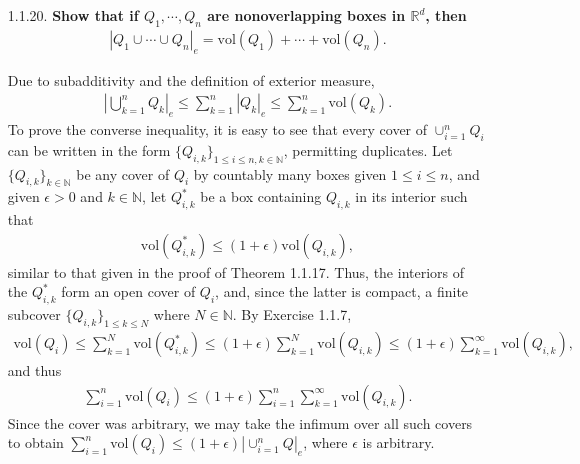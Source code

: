\documentclass[a4paper,12pt]{article}
\begin{document}
\begin{enumerate}
    \item[1.1.20.]
        \boldmath\textbf{Show that if $Q_1, \cdots, Q_n$ are nonoverlapping boxes in $\mathbb{R}^d$, then
        \begin{align*}
            |Q_1 \cup \cdots \cup Q_n|_e = \text{vol}(Q_1) + \cdots + \text{vol}(Q_n).
        \end{align*}
        }\unboldmath \par
        Due to subadditivity and the definition of exterior measure,
        \begin{align*}
            \left| \bigcup_{k = 1}^n Q_k \right|_e \leq \sum_{k = 1}^n |Q_k|_e \leq \sum_{k = 1}^n \text{vol}(Q_k).
        \end{align*}
        To prove the converse inequality, it is easy to see that every cover of $\cup_{i = 1}^n Q_i$ can be written in the form $\{Q_{i, k}\}_{1 \leq i \leq n, k \in \mathbb{N}}$, permitting duplicates. Let $\{Q_{i, k}\}_{k \in \mathbb{N}}$ be any cover of $Q_i$ by countably many boxes given $1 \leq i \leq n$, and given $\epsilon > 0$ and $k \in \mathbb{N}$, let $Q_{i, k}^*$ be a box containing $Q_{i, k}$ in its interior such that
        \begin{align*}
            \text{vol}(Q_{i, k}^*) \leq (1 + \epsilon) \text{vol}(Q_{i, k}),
        \end{align*}
        similar to that given in the proof of Theorem 1.1.17. Thus, the interiors of the $Q_{i, k}^*$ form an open cover of $Q_i$, and, since the latter is compact, a finite subcover $\{Q_{i, k}\}_{1 \leq k \leq N}$ where $N \in \mathbb{N}$. By Exercise 1.1.7,
        \begin{align*}
            \text{vol}(Q_i) \leq \sum_{k = 1}^N \text{vol}(Q_{i, k}^*) \leq (1 + \epsilon) \sum_{k = 1}^N \text{vol}(Q_{i, k}) \leq (1 + \epsilon) \sum_{k = 1}^\infty \text{vol}(Q_{i, k}),
        \end{align*}
        and thus
        \begin{align*}
            \sum_{i = 1}^n \text{vol}(Q_i) \leq (1 + \epsilon) \sum_{i = 1}^n \sum_{k = 1}^\infty \text{vol}(Q_{i, k}).
        \end{align*}
        Since the cover was arbitrary, we may take the infimum over all such covers to obtain $\sum_{i = 1}^n \text{vol}(Q_i) \leq (1 + \epsilon) |\cup_{i = 1}^n Q|_e$, where $\epsilon$ is arbitrary.
\end{enumerate}
\end{document}
